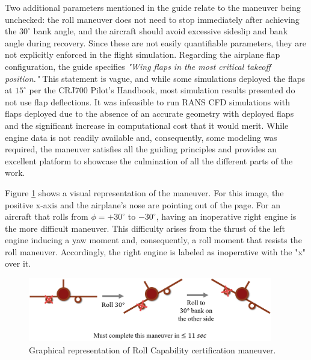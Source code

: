 Two additional parameters mentioned in the guide relate to the maneuver being unchecked: the roll maneuver does not need to stop immediately after achieving the $30 ^\circ$ bank angle, and the aircraft should avoid excessive sideslip and bank angle during recovery.
Since these are not easily quantifiable parameters, they are not explicitly enforced in the flight simulation.
Regarding the airplane flap configuration, the guide specifies \textit{"Wing flaps in the most critical takeoff position."}
This statement is vague, and while some simulations deployed the flaps at $15^\circ$ per the CRJ700 Pilot's Handbook, most simulation results presented do not use flap deflections. 
It was infeasible to run RANS CFD simulations with flaps deployed due to the absence of an accurate geometry with deployed flaps and the significant increase in computational cost that it would merit.  
While engine data is not readily available and, consequently, some modeling was required, the maneuver satisfies all the guiding principles and provides an excellent platform to showcase the culmination of all the different parts of the work.

Figure \ref{fig:roll_maneuver} shows a visual representation of the maneuver. 
For this image, the positive x-axis and the airplane's nose are pointing out of the page.
For an aircraft that rolls from $\phi = +30^\circ$ to $-30^\circ$, having an inoperative right engine is the more difficult maneuver.
This difficulty arises from the thrust of the left engine inducing a yaw moment and, consequently, a roll moment that resists the roll maneuver.
Accordingly, the right engine is labeled as inoperative with the "x" over it.

\begin{figure}
    \center
    \includegraphics[width=0.95\textwidth]{suthesis/images/roll_maneuver.png}
    \caption{Graphical representation of Roll Capability certification maneuver. \label{fig:roll_maneuver}}
\end{figure}